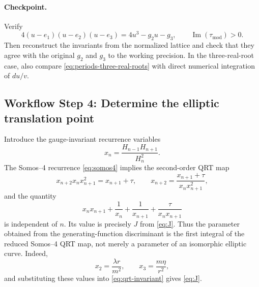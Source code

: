 \documentclass[11pt]{article}
\newcommand{\workflowstep}[1]{\subsection{Workflow Step #1}}
\newcommand{\taupar}{\tau}
\newcommand{\taumod}{\tau_{\mathrm{mod}}}
\begin{document}
\paragraph{Checkpoint.}
Verify
\[
  4(u-e_1)(u-e_2)(u-e_3)=4u^3-g_2u-g_3,
  \qquad \operatorname{Im}(\taumod)>0.
\]
Then reconstruct the invariants from the normalized lattice and check that
they agree with the original $g_2$ and $g_3$ to the working precision. In the
three-real-root case, also compare \cref{eq:periods-three-real-roots} with
direct numerical integration of $du/v$.

\workflowstep{4: Determine the elliptic translation point}
Introduce the gauge-invariant recurrence variables
\begin{equation}
  x_n=\frac{H_{n-1}H_{n+1}}{H_n^2}.
  \label{eq:qrt-variable}
\end{equation}
The Somos--4 recurrence \cref{eq:somos4} implies the second-order QRT map
\begin{equation}
  x_{n+2}x_nx_{n+1}^2=x_{n+1}+\taupar,
  \qquad
  x_{n+2}=\frac{x_{n+1}+\taupar}{x_nx_{n+1}^2},
  \label{eq:qrt-map}
\end{equation}
and the quantity
\begin{equation}
  x_nx_{n+1}+\frac{1}{x_n}+\frac{1}{x_{n+1}}
  +\frac{\taupar}{x_nx_{n+1}}
  \label{eq:qrt-invariant}
\end{equation}
is independent of $n$. Its value is precisely $J$ from \cref{eq:J}. Thus the
parameter obtained from the generating-function discriminant is the first
integral of the reduced Somos--4 QRT map, not merely a parameter of an
isomorphic elliptic curve. Indeed,
\[
  x_2=\frac{\lambda r}{m^2},
  \qquad
  x_3=\frac{m\eta}{r^2},
\]
and substituting these values into \cref{eq:qrt-invariant} gives
\cref{eq:J}.
\end{document}
